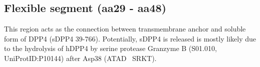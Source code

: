 \subsection{Flexible segment (aa29 - aa48)}

This region acts as the connection between transmembrane anchor and soluble form of DPP4 (sDPP4 39-766). Potentially, sDPP4 is released is mostly likely due to the hydrolysis of hDPP4 by serine protease Granzyme B (S01.010, UniProtID:P10144) after Asp38 (ATAD~\textbar 
SRKT).~\cite{Song_2018} 
